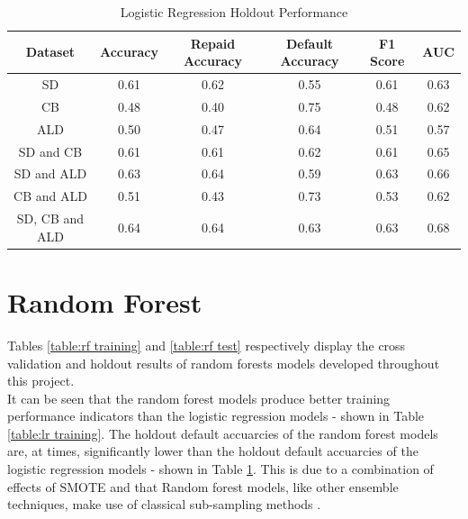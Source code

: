 \vspace{10pt}

\begin{table}[H]
\begin{center}
\begin{tabular}{|c|c|c|c|c|c|} 
\hline
\multicolumn{1}{|c|}{Dataset}
&\multicolumn{1}{|c|}{Accuracy}
&\multicolumn{1}{|c|}{Repaid Accuracy}
&\multicolumn{1}{|c|}{Default Accuracy}
&\multicolumn{1}{|c|}{F1 Score}
&\multicolumn{1}{|c|}{AUC}\\
\hline
SD & 0.61 & 0.62 & 0.55 & 0.61 & 0.63    \\
\hline
CB & 0.48 & 0.40 & 0.75 & 0.48 & 0.62    \\
\hline
ALD & 0.50 & 0.47 & 0.64 & 0.51 & 0.57    \\
\hline
SD and CB & 0.61 & 0.61 & 0.62 & 0.61 & 0.65    \\
\hline
SD and ALD & 0.63 & 0.64 & 0.59 & 0.63 & 0.66    \\
\hline
CB and ALD & 0.51 & 0.43 & 0.73 & 0.53 & 0.62    \\
\hline
SD, CB and ALD & 0.64 & 0.64 & 0.63 & 0.63 & 0.68    \\
\hline
\end{tabular}
\end{center}
\caption{Logistic Regression Holdout Performance}
\label{table:lr test}
\end{table}

\vspace{10pt}



\section{Random Forest}

Tables \ref{table:rf training} and \ref{table:rf test} respectively display the cross validation and holdout results of random forests models developed throughout this project. \\

It can be seen that the random forest models produce better training performance indicators than the logistic regression models - shown in Table \ref{table:lr training}. The holdout default accuarcies of the random forest models are, at times, significantly  lower than the holdout default accuarcies of the logistic regression models - shown in Table \ref{table:lr test}. This is due to a combination of effects of SMOTE and that Random forest models, like other ensemble techniques, make use of classical sub-sampling methods \parencite{Minority}. \\

